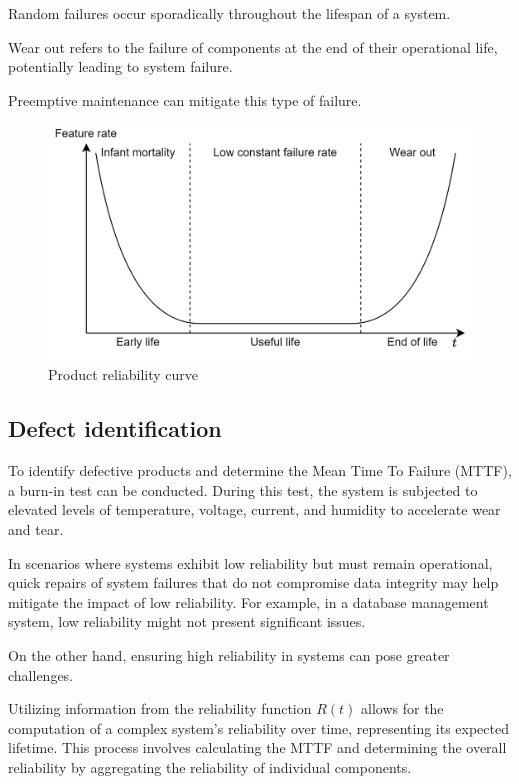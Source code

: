 \begin{definition}
    Random failures occur sporadically throughout the lifespan of a system.
\end{definition}
\begin{definition}
    Wear out refers to the failure of components at the end of their operational life, potentially leading to system failure. 
\end{definition}
Preemptive maintenance can mitigate this type of failure.
\begin{figure}[H]
    \centering
    \includegraphics[width=0.55\linewidth]{images/dep2.png}
    \caption{Product reliability curve}
\end{figure}

\subsection{Defect identification}
To identify defective products and determine the Mean Time To Failure (MTTF), a burn-in test can be conducted. 
During this test, the system is subjected to elevated levels of temperature, voltage, current, and humidity to accelerate wear and tear.

In scenarios where systems exhibit low reliability but must remain operational, quick repairs of system failures that do not compromise data integrity may help mitigate the impact of low reliability. 
For example, in a database management system, low reliability might not present significant issues.

On the other hand, ensuring high reliability in systems can pose greater challenges.

Utilizing information from the reliability function $R(t)$ allows for the computation of a complex system's reliability over time, representing its expected lifetime. 
This process involves calculating the MTTF and determining the overall reliability by aggregating the reliability of individual components.

